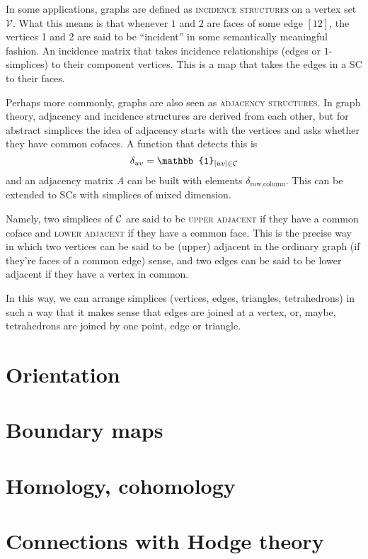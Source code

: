 \documentclass{tufte-handout}
\newcommand{\define}{\textsc}
\newcommand{\ve}{\mathcal{V}}
\begin{document}
In some applications, graphs are defined as \define{incidence structures} on a vertex set $\ve$. What this means is that whenever $1$ and $2$ are faces of some edge $[12]$, the vertices 1 and 2 are said to be ``incident'' in some semantically meaningful fashion. An incidence matrix that takes incidence relationships (edges or $1$-simplices) to their component vertices. This is a map that takes the edges in a SC to their faces.

Perhaps more commonly, graphs are also seen as \define{adjacency structures}. In graph theory,  adjacency and incidence structures are derived from each other, but for abstract simplices the idea of adjacency starts with the vertices and asks whether they have common cofaces. A function that detects this is
\[
\delta_{uv}=\mathbb{1}_{[uv]\in\sc}
\]
and an adjacency matrix $A$ can be built with elements $\delta_{\text{row},\text{column}}$. This can be extended to SCs with simplices of mixed dimension. 

Namely, two simplices of $\sc$ are said to be \define{upper adjacent} if they have a common coface and \define{lower adjacent} if they have a common face. This is the precise way in which two vertices can be said to be (upper) adjacent in the ordinary graph (if they're faces of a common edge) sense, and two edges can be said to be lower adjacent if they have a vertex in common.

In this way, we can arrange simplices (vertices, edges, triangles, tetrahedrons) in such a way that it makes sense that edges are joined at a vertex, or, maybe, tetrahedrons are joined by one point, edge or triangle. 
\section{Orientation}
\section{Boundary maps}
\section{Homology, cohomology}

\section{Connections with Hodge theory}
\nocite{*}


\end{document}
